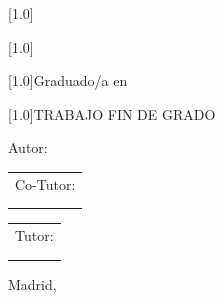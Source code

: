 \begin{titlepage}
\begin{center}
    \vspace*{0.1cm}

    \scalebox{.7}[1.0]{\huge{\MakeUppercase{\Universidad}}} \vspace*{1cm}

    \scalebox{.7}[1.0]{\huge{\MakeUppercase{\Centro}}} \vspace*{0.8cm}
    
    \scalebox{.7}[1.0]{\LARGE{Graduado/a en \Grado}} \vspace*{0.25cm}

    \scalebox{.7}[1.0]{\Huge{TRABAJO FIN DE GRADO}} \vspace*{2.0cm}

    \LARGE{\textbf{\textit{\TituloTFG}}} \vspace*{2.0cm}

    \LARGE{Autor: \NombreAutor}

  \end{center}

\endgroup

  \vspace*{2.0cm}

  \begin{minipage}{0.1\linewidth}
    \hspace*{-1.5cm}
    \noindent
    \begin{tabular}{l}
      Co-Tutor: \\
      \NombreCoTutor{} \\
      \DepartamentoCoTutor{}
    \end{tabular}
  \end{minipage}
  \begin{minipage}{0.4\linewidth}
    \begin{center}
      \qquad
    \end{center}
  \end{minipage}
  \begin{minipage}{0.1\linewidth}
    \noindent
    \begin{tabular}{l}
      Tutor: \\
      \NombreTutor{} \\
      \DepartamentoTutor{}
    \end{tabular}
  \end{minipage}

  \begin{flushright}
    \vspace*{\fill}
    Madrid, \FechaLectura
  \end{flushright}


\end{titlepage}
